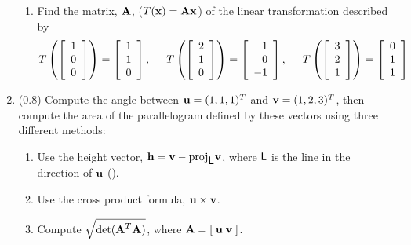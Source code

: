 \documentclass[11pt,titlepage,fleqn]{article}
\begin{document}
\begin{enumerate}
\begin{enumerate}
\item Find the matrix, $\mbox{${\bf A}$}$, ($T(\mbox{${\bf x}$}) = \mbox{${\bf A}$}\mbox{${\bf x}$}$) of the linear transformation described by
%
\begin{equation*}
T \left( \left[ \begin{array}{r} 1 \\ 0 \\ 0  \end{array} \right] \right) = \left[ \begin{array}{r} 1 \\ 1 \\ 0 \end{array} \right],
\hspace{0.5cm}
T \left( \left[ \begin{array}{r} 2 \\ 1 \\ 0  \end{array} \right] \right) = \left[ \begin{array}{r} 1 \\ 0 \\ -1 \end{array} \right],
\hspace{0.5cm}
T \left( \left[ \begin{array}{r} 3 \\ 2 \\ 1  \end{array} \right] \right) = \left[ \begin{array}{r} 0 \\ 1 \\ 1 \end{array} \right]
\end{equation*}

\end{enumerate}


\item (0.8) Compute the angle between $\mbox{${\bf u}$} = (1,1,1)^T$ and $\mbox{${\bf v}$} = (1,2,3)^T$, then compute the area of the parallelogram defined by these vectors using three different methods:
%
\begin{enumerate}
\item Use the height vector, $\mbox{${\bf h}$} = \mbox{${\bf v}$} - \mathrm{proj}_{\mbox{${\sf L}$}} \mbox{${\bf v}$}$, where $\mbox{${\sf L}$}$ is the line in the direction of $\mbox{${\bf u}$}$ ().
\item Use the cross product formula, $\mbox{${\bf u}$} \times \mbox{${\bf v}$}$.
\item Compute $\sqrt{\det(\mbox{${\bf A}$}^T \mbox{${\bf A}$})}$, where $\mbox{${\bf A}$} = [\;\mbox{${\bf u}$} \; \mbox{${\bf v}$}\;]$.
\end{enumerate}


\end{enumerate}
\end{document}
